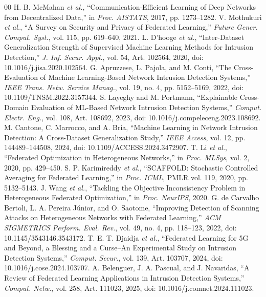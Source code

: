 \documentclass[conference,a4paper]{IEEEtran}
\begin{document}
\begin{thebibliography}{00}
 H. B. McMahan \textit{et al.}, ``Communication-Efficient Learning of Deep Networks from Decentralized Data,'' in \textit{Proc. AISTATS}, 2017, pp. 1273--1282.
 V. Mothukuri \textit{et al.}, ``A Survey on Security and Privacy of Federated Learning,'' \textit{Future Gener. Comput. Syst.}, vol. 115, pp. 619--640, 2021.
 L. D'hooge \textit{et al.}, ``Inter-Dataset Generalization Strength of Supervised Machine Learning Methods for Intrusion Detection,'' \textit{J. Inf. Secur. Appl.}, vol. 54, Art. 102564, 2020, doi: 10.1016/j.jisa.2020.102564.
 G. Apruzzese, L. Pajola, and M. Conti, ``The Cross-Evaluation of Machine Learning-Based Network Intrusion Detection Systems,'' \textit{IEEE Trans. Netw. Service Manag.}, vol. 19, no. 4, pp. 5152--5169, 2022, doi: 10.1109/TNSM.2022.3157344.
 S. Layeghy and M. Portmann, ``Explainable Cross-Domain Evaluation of ML-Based Network Intrusion Detection Systems,'' \textit{Comput. Electr. Eng.}, vol. 108, Art. 108692, 2023, doi: 10.1016/j.compeleceng.2023.108692.
 M. Cantone, C. Marrocco, and A. Bria, ``Machine Learning in Network Intrusion Detection: A Cross-Dataset Generalization Study,'' \textit{IEEE Access}, vol. 12, pp. 144489--144508, 2024, doi: 10.1109/ACCESS.2024.3472907.
 T. Li \textit{et al.}, ``Federated Optimization in Heterogeneous Networks,'' in \textit{Proc. MLSys}, vol. 2, 2020, pp. 429--450.
 S. P. Karimireddy \textit{et al.}, ``SCAFFOLD: Stochastic Controlled Averaging for Federated Learning,'' in \textit{Proc. ICML}, PMLR vol. 119, 2020, pp. 5132--5143.
 J. Wang \textit{et al.}, ``Tackling the Objective Inconsistency Problem in Heterogeneous Federated Optimization,'' in \textit{Proc. NeurIPS}, 2020.
 G. de Carvalho Bertoli, L. A. Pereira J\'{u}nior, and O. Saotome, ``Improving Detection of Scanning Attacks on Heterogeneous Networks with Federated Learning,'' \textit{ACM SIGMETRICS Perform. Eval. Rev.}, vol. 49, no. 4, pp. 118--123, 2022, doi: 10.1145/3543146.3543172.
 T. E. T. Djaidja \textit{et al.}, ``Federated Learning for 5G and Beyond, a Blessing and a Curse--An Experimental Study on Intrusion Detection Systems,'' \textit{Comput. Secur.}, vol. 139, Art. 103707, 2024, doi: 10.1016/j.cose.2024.103707.
 A. Belenguer, J. A. Pascual, and J. Navaridas, ``A Review of Federated Learning Applications in Intrusion Detection Systems,'' \textit{Comput. Netw.}, vol. 258, Art. 111023, 2025, doi: 10.1016/j.comnet.2024.111023.

\end{thebibliography}
\end{document}
